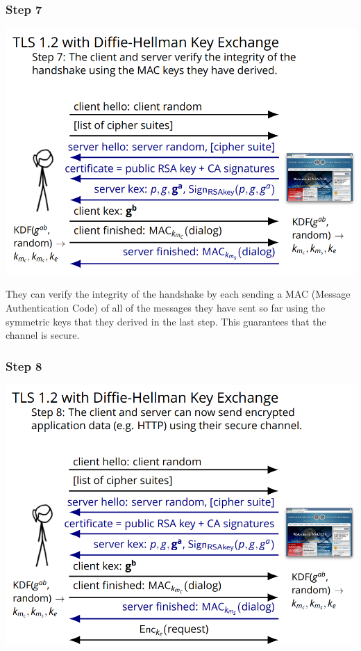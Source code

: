 \documentclass[11pt]{article} %
\begin{document}
\subsubsection{Step 7}

\begin{center}
	\includegraphics[scale=.8]{./DiffieStep7.png}
\end{center}

\noindent They can verify the integrity of the handshake by each sending a MAC (Message 
Authentication Code) of all of the messages they have sent so far using the 
symmetric keys that they derived in the last step. This guarantees that the channel is secure.

\subsubsection{Step 8}

\begin{center}
	\includegraphics[scale=.8]{./DiffieStep8.png}
\end{center}
\end{document}
